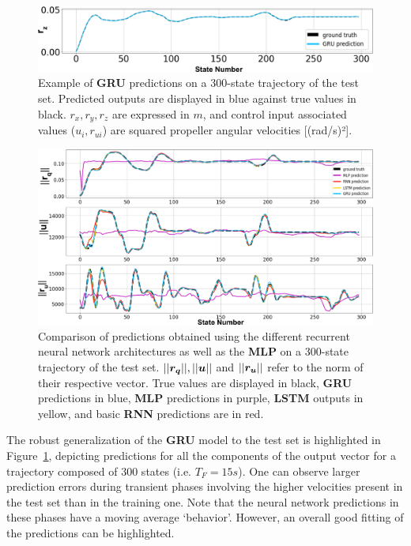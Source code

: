 \begin{figure}[t]
\begin{subfigure}{0.49\linewidth}
    \end{subfigure}
    \includegraphics[width=0.49\linewidth]{figures/learning_quadrotor/pred_rz.png}
    \caption{Example of \textbf{GRU} predictions on a 300-state trajectory of the test set. 
    Predicted outputs are displayed in blue against true values in black. $r_{x}, r_{y}, r_{z}$ are expressed in $m$, and control input associated values ($u_{i},r_{ui}$) are squared propeller angular velocities [(rad/s)²].}
    \label{fig:pred_test}
\end{figure}

\begin{figure}[h]
    \centering
    \includegraphics[width=0.8\linewidth]{figures/learning_quadrotor/all_models.png}
    \caption{Comparison of predictions obtained using the different recurrent neural network architectures as well as the \textbf{MLP} on a 300-state trajectory of the test set. $||\boldsymbol{r_q}||, ||\boldsymbol{u}||$ and $||\boldsymbol{r_u}||$ refer to the norm of their respective vector. 
    True values are displayed in black, \textbf{GRU} predictions in blue, \textbf{MLP} predictions in purple, \textbf{LSTM} outputs in yellow, and basic \textbf{RNN} predictions are in red.}
    \label{fig:MLP_pred_val}
\end{figure}

The robust generalization of the \textbf{GRU} model to the test set is highlighted in Figure~\ref{fig:pred_test}, depicting predictions for all the components of the output vector for a trajectory composed of 300 states (i.e. $T_F=15s$).
One can observe larger prediction errors during transient phases involving the higher velocities present in the test set than in the training one.
Note that the neural network predictions in these phases have a moving average `behavior'. 
However, an overall good fitting of the predictions can be highlighted.

